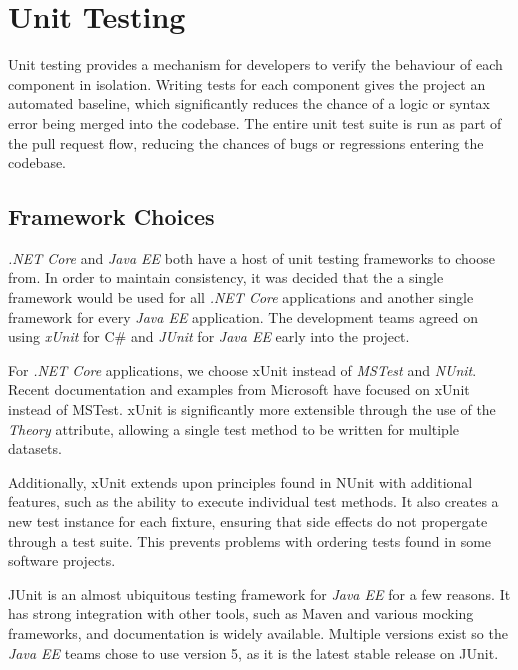 \section{Unit Testing}
\par
Unit testing provides a mechanism for developers to verify the behaviour of each component in isolation. Writing tests for each component gives the project an automated baseline, which significantly reduces the chance of a logic or syntax error being merged into the codebase. The entire unit test suite is run as part of the pull request flow, reducing the chances of bugs or regressions entering the codebase.

\par
\subsection{Framework Choices}
\textit{.NET Core} and \textit{Java EE} both have a host of unit testing frameworks to choose from. In order to maintain consistency, it was decided that the a single framework would be used for all \textit{.NET Core} applications and another single framework for every \textit{Java EE} application. The development teams agreed on using \textit{xUnit}\cite{xUnit} for C\# and \textit{JUnit}\cite{JUnit} for \textit{Java EE} early into the project.

\par
For \textit{.NET Core} applications, we choose xUnit instead of \textit{MSTest} and \textit{NUnit}. Recent documentation and examples from Microsoft have focused on xUnit instead of MSTest. xUnit is significantly more extensible through the use of the \textit{Theory} attribute, allowing a single test method to be written for multiple datasets.

\par
Additionally, xUnit extends upon principles found in NUnit with additional features, such as the ability to execute individual test methods\cite{Nunit_XUnit_comparison}. It also creates a new test instance for each fixture, ensuring that side effects do not propergate through a test suite. This prevents problems with ordering tests found in some software projects.

\par
JUnit is an almost ubiquitous testing framework for \textit{Java EE} for a few reasons. It has strong integration with other tools, such as Maven and various mocking frameworks, and documentation is widely available. Multiple versions exist so the \textit{Java EE} teams chose to use version 5, as it is the latest stable release on JUnit.

